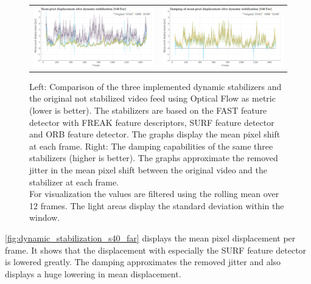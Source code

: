 \begin{figure}[!ht]
    \centering
    \begin{tabular}{cc}
      \includegraphics[width=0.475\linewidth]{diagrams/optical_flow/mean_pixel_shifts_after_dynamic_stabilization_s40_far.png}    &  
      \includegraphics[width=0.475\linewidth]{diagrams/optical_flow/damping_mean_pixel_shifts_after_dynamic_stabilization_s40_far.png}    
\end{tabular}
    \caption{Left: 
        Comparison of the three implemented dynamic stabilizers and the original not stabilized video feed using Optical Flow as metric (lower is better).
        The stabilizers are based on the 
        FAST \cite{Ghahremani_2021,opencv_library} feature detector with FREAK \cite{alahi6247715,opencv_library} feature descriptors,
        SURF \cite{bay10.1007/11744023_32,opencv_library} feature detector and
        ORB \cite{rublee6126544, opencv_library} feature detector.
        The graphs display the mean pixel shift at each frame. 
        Right: 
        The damping capabilities of the same three stabilizers (higher is better). 
        The graphs approximate the removed jitter in the mean pixel shift between the original video and the stabilizer at each frame.\\
        For visualization the values are filtered using the rolling mean over 12 frames. 
        The light areas display the standard deviation within the window.
    }
    \label{fig:dynamic_stabilization_s40_far}
\end{figure}

\autoref{fig:dynamic_stabilization_s40_far} displays the mean pixel displacement per frame.
It shows that the displacement with especially the SURF \cite{bay10.1007/11744023_32,opencv_library} feature detector is lowered greatly. 
The damping approximates the removed jitter and also displays a huge lowering in mean displacement.


